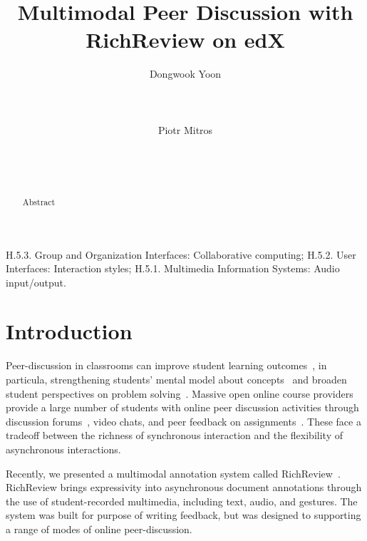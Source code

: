 \documentclass{sigchi}
\begin{document}
\title{Multimodal Peer Discussion with RichReview on edX}

\author{
  \alignauthor Dongwook Yoon\\
    \\
    \\
    \\
  \alignauthor Piotr Mitros\\
    \\
    \\
    \\
}

\maketitle

\begin{abstract}
Abstract
\end{abstract}


\category
{H.5.3.} Group and Organization Interfaces: Collaborative computing; {H.5.2.} User Interfaces: Interaction styles; {H.5.1.} Multimedia Information Systems: Audio input/output.

\section{Introduction}

Peer-discussion in classrooms can improve student learning outcomes~\cite{chi2014icap}, in particula, strengthening students’ mental model about concepts~\cite{nicol2003peer} and broaden student perspectives on problem solving~\cite{smith2009peer}.
Massive open online course providers provide a large number of students with online peer discussion activities through discussion forums~\cite{mitros-6002x}, video chats, and peer feedback on assignments~\cite{mitros-linc}. These face a tradeoff between the richness of synchronous interaction and the flexibility of asynchronous interactions.

Recently, we presented a multimodal annotation system called RichReview~\cite{yoon2014richreview}.
RichReview brings expressivity into asynchronous document annotations through the use of student-recorded multimedia, including text, audio, and gestures.
The system was built for purpose of writing feedback, but was designed to supporting a range of modes of online peer-discussion.
\end{document}
